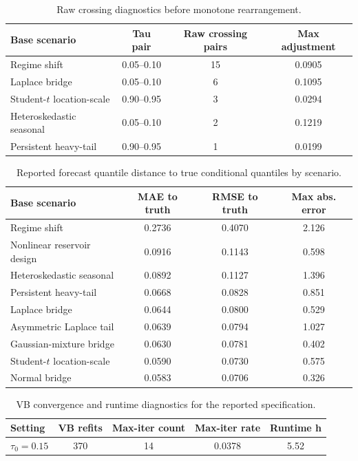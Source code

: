 \begin{table}[t]
\centering
\small
\begin{tabular}{@{}>{\raggedright\arraybackslash}p{}ccc@{}}
\toprule
Base scenario & Tau pair & Raw crossing pairs & Max adjustment \\
\midrule
Regime shift & 0.05--0.10 & 15 & 0.0905 \\
Laplace bridge & 0.05--0.10 & 6 & 0.1095 \\
Student-\(t\) location-scale & 0.90--0.95 & 3 & 0.0294 \\
Heteroskedastic seasonal & 0.05--0.10 & 2 & 0.1219 \\
Persistent heavy-tail & 0.90--0.95 & 1 & 0.0199 \\
\bottomrule
\end{tabular}
\caption{Raw crossing diagnostics before monotone rearrangement.}
\label{tab:joint-qvp-phase4k-crossing-diagnostics}
\end{table}

\begin{table}[t]
\centering
\small
\begin{tabular}{@{}>{\raggedright\arraybackslash}p{}ccc@{}}
\toprule
Base scenario & MAE to truth & RMSE to truth & Max abs. error \\
\midrule
Regime shift & 0.2736 & 0.4070 & 2.126 \\
Nonlinear reservoir design & 0.0916 & 0.1143 & 0.598 \\
Heteroskedastic seasonal & 0.0892 & 0.1127 & 1.396 \\
Persistent heavy-tail & 0.0668 & 0.0828 & 0.851 \\
Laplace bridge & 0.0644 & 0.0800 & 0.529 \\
Asymmetric Laplace tail & 0.0639 & 0.0794 & 1.027 \\
Gaussian-mixture bridge & 0.0630 & 0.0781 & 0.402 \\
Student-\(t\) location-scale & 0.0590 & 0.0730 & 0.575 \\
Normal bridge & 0.0583 & 0.0706 & 0.326 \\
\bottomrule
\end{tabular}
\caption{Reported forecast quantile distance to true conditional quantiles by scenario.}
\label{tab:joint-qvp-phase4k-scenario-summary}
\end{table}

\begin{table}[t]
\centering
\small
\begin{tabular}{@{}>{\raggedright\arraybackslash}p{}cccc@{}}
\toprule
Setting & VB refits & Max-iter count & Max-iter rate & Runtime h \\
\midrule
\(\tau_0=0.15\) & 370 & 14 & 0.0378 & 5.52 \\
\bottomrule
\end{tabular}
\caption{VB convergence and runtime diagnostics for the reported specification.}
\label{tab:joint-qvp-phase4k-runtime-convergence}
\end{table}
